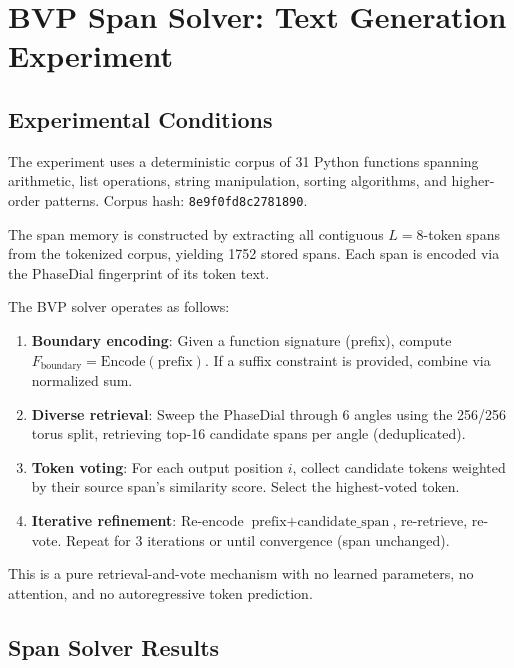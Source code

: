 \section{BVP Span Solver: Text Generation Experiment}

\subsection{Experimental Conditions}
The experiment uses a deterministic corpus of 31 Python functions spanning arithmetic, list operations, string manipulation, sorting algorithms, and higher-order patterns. Corpus hash: \texttt{8e9f0fd8c2781890}.

The span memory is constructed by extracting all contiguous $L=8$-token spans from the tokenized corpus, yielding 1752 stored spans. Each span is encoded via the PhaseDial fingerprint of its token text.

The BVP solver operates as follows:
\begin{enumerate}
    \item \textbf{Boundary encoding}: Given a function signature (prefix), compute $F_{\text{boundary}} = \text{Encode}(\text{prefix})$. If a suffix constraint is provided, combine via normalized sum.
    \item \textbf{Diverse retrieval}: Sweep the PhaseDial through 6 angles using the 256/256 torus split, retrieving top-16 candidate spans per angle (deduplicated).
    \item \textbf{Token voting}: For each output position $i$, collect candidate tokens weighted by their source span's similarity score. Select the highest-voted token.
    \item \textbf{Iterative refinement}: Re-encode $\text{prefix} + \text{candidate\_span}$, re-retrieve, re-vote. Repeat for 3 iterations or until convergence (span unchanged).
\end{enumerate}

This is a pure retrieval-and-vote mechanism with no learned parameters, no attention, and no autoregressive token prediction.

\subsection{Span Solver Results}

